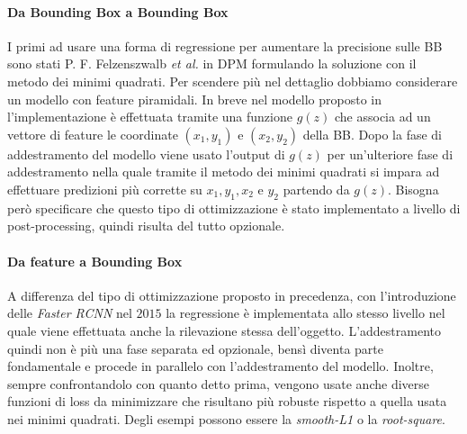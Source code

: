 \paragraph{Da Bounding Box a Bounding Box}
I primi ad usare una forma di regressione per aumentare la precisione sulle \ac{BB} sono stati P. F. Felzenszwalb \textit{et al.} in DPM \cite{5255236} formulando la soluzione con il metodo dei minimi quadrati. Per scendere più nel dettaglio dobbiamo considerare un modello con feature piramidali.
In breve nel modello proposto in \cite{5255236} l'implementazione è effettuata tramite una funzione $g(z)$ che associa ad un vettore di feature le coordinate $(x_1, y_1)$ e $(x_2, y_2)$ della \ac{BB}. Dopo la fase di addestramento del modello viene usato l'output di $g(z)$ per un'ulteriore fase di addestramento nella quale tramite il metodo dei minimi quadrati si impara ad effettuare predizioni più corrette su $x_1, y_1, x_2 \text{ e } y_2$ partendo da $g(z)$. Bisogna però specificare che questo tipo di ottimizzazione è stato implementato a livello di post-processing, quindi risulta del tutto opzionale.
\paragraph{Da feature a Bounding Box}
A differenza del tipo di ottimizzazione proposto in precedenza, con l'introduzione delle \textit{Faster RCNN} \cite{ren2015faster} nel $2015$ la regressione è implementata allo stesso livello nel quale viene effettuata anche la rilevazione stessa dell'oggetto. L'addestramento quindi non è più una fase separata ed opzionale, bensì diventa parte fondamentale e procede in parallelo con l'addestramento del modello.  Inoltre, sempre confrontandolo con quanto detto prima, vengono usate anche diverse funzioni di loss da minimizzare che risultano più robuste rispetto a quella usata nei minimi quadrati. Degli esempi possono essere la \textit{smooth-L1} o la \textit{root-square}.


